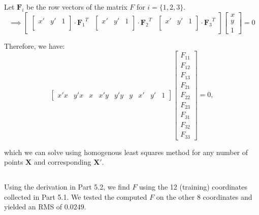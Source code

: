 Let ${\mathbf F_i}$ be the row vectors of the matrix $F$ for $i = \{1, 2, 3\}$.
\begin{equation*}
\implies
\begin{bmatrix}
\begin{bmatrix}
x' & y' & 1 \\
\end{bmatrix} \cdot {\mathbf F_1}^T

&

\begin{bmatrix}
x' & y' & 1 \\
\end{bmatrix} \cdot {\mathbf F_2}^T

& 

\begin{bmatrix}
x' & y' & 1 \\
\end{bmatrix} \cdot {\mathbf F_3}^T

\end{bmatrix}
\begin{bmatrix}
x \\
y \\
1
\end{bmatrix}
 = 0
\end{equation*}


Therefore, we have:
\begin{equation*}
\begin{bmatrix}
x'x & y'x & x & x'y & y'y & y & x' & y' & 1 
\end{bmatrix} 
\begin{bmatrix}
F_{11} \\
F_{12} \\
F_{13} \\
F_{21} \\
F_{22} \\
F_{23} \\
F_{31} \\
F_{32} \\
F_{33}
\end{bmatrix}
= 0,
\end{equation*}

which we can solve using homogenous least squares method for any number of points ${\mathbf X}$ and corresponding ${\mathbf X'}$. 

\subsection{} 
Using the derivation in Part 5.2, we find $F$ using the 12 (training) coordinates collected in Part 5.1. We tested the computed $F$ on the other $8$ coordinates and yielded an RMS of $0.0249$. 

